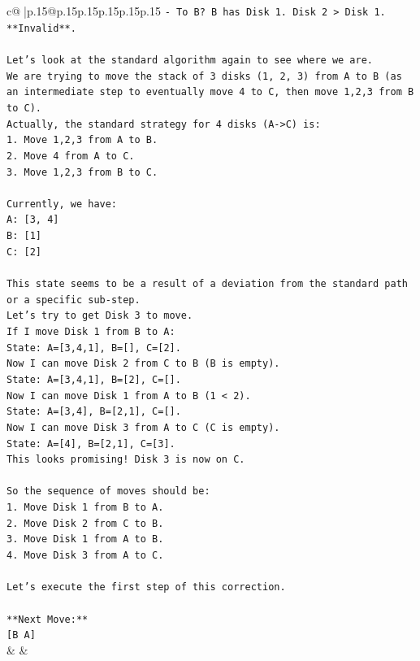 \documentclass{article}
\begin{document}
{\begin{supertabular}{c@{$\;$}|p{.15\linewidth}@{}p{.15\linewidth}p{.15\linewidth}p{.15\linewidth}p{.15\linewidth}p{.15\linewidth}}
{{{\texttt{{-} To B? B has Disk 1. Disk 2 > Disk 1. **Invalid**.} \\
\\ 
\texttt{Let's look at the standard algorithm again to see where we are.} \\
\texttt{We are trying to move the stack of 3 disks (1, 2, 3) from A to B (as an intermediate step to eventually move 4 to C, then move 1,2,3 from B to C).} \\
\texttt{Actually, the standard strategy for 4 disks (A{-}>C) is:} \\
\texttt{1. Move 1,2,3 from A to B.} \\
\texttt{2. Move 4 from A to C.} \\
\texttt{3. Move 1,2,3 from B to C.} \\
\\ 
\texttt{Currently, we have:} \\
\texttt{A: {[}3, 4{]}} \\
\texttt{B: {[}1{]}} \\
\texttt{C: {[}2{]}} \\
\\ 
\texttt{This state seems to be a result of a deviation from the standard path or a specific sub{-}step.} \\
\texttt{Let's try to get Disk 3 to move.} \\
\texttt{If I move Disk 1 from B to A:} \\
\texttt{State: A={[}3,4,1{]}, B={[}{]}, C={[}2{]}.} \\
\texttt{Now I can move Disk 2 from C to B (B is empty).} \\
\texttt{State: A={[}3,4,1{]}, B={[}2{]}, C={[}{]}.} \\
\texttt{Now I can move Disk 1 from A to B (1 < 2).} \\
\texttt{State: A={[}3,4{]}, B={[}2,1{]}, C={[}{]}.} \\
\texttt{Now I can move Disk 3 from A to C (C is empty).} \\
\texttt{State: A={[}4{]}, B={[}2,1{]}, C={[}3{]}.} \\
\texttt{This looks promising! Disk 3 is now on C.} \\
\\ 
\texttt{So the sequence of moves should be:} \\
\texttt{1. Move Disk 1 from B to A.} \\
\texttt{2. Move Disk 2 from C to B.} \\
\texttt{3. Move Disk 1 from A to B.} \\
\texttt{4. Move Disk 3 from A to C.} \\
\\ 
\texttt{Let's execute the first step of this correction.} \\
\\ 
\texttt{**Next Move:**} \\
\texttt{{[}B A{]}} \\
            }
        }
    }
    & & \\ \\


\end{supertabular}}
\end{document}
